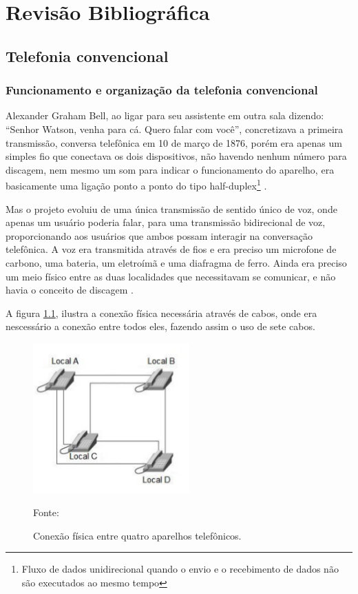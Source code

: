
\chapter{Revisão Bibliográfica} %
\section{Telefonia convencional}
\subsection{Funcionamento e organização da telefonia convencional}

Alexander Graham Bell, ao ligar para seu assistente em outra sala dizendo: “Senhor Watson, venha para cá. Quero falar com você”, concretizava a primeira transmissão, conversa telefônica em 10 de março de 1876, porém era apenas um simples fio que conectava os dois dispositivos, não havendo nenhum número para discagem, nem mesmo um som para indicar o funcionamento do aparelho, era basicamente uma ligação ponto a ponto do tipo half-duplex\footnote{Fluxo de dados unidirecional quando o envio e o recebimento de dados não são executados ao mesmo tempo} \cite{maxaltman2010}.

Mas o projeto evoluiu de uma única transmissão de sentido único de voz, onde apenas um usuário poderia falar, para uma transmissão bidirecional de voz, proporcionando aos usuários que ambos possam interagir na conversação telefônica. A voz era transmitida através de fios e era preciso um microfone de carbono, uma bateria, um eletroímã e uma diafragma de ferro. Ainda era preciso um meio físico entre as duas localidades que necessitavam se comunicar, e não havia o conceito de discagem \cite{eduardomaronasmonks2006}.

A figura \ref{Figura1}, ilustra a conexão física necessária através de cabos, onde era nescessário a conexão entre todos eles, fazendo assim o uso de sete cabos.
\begin{figure}[h]
	\centering
	\includegraphics[width=6.0cm]{imagens/rebeBasicaQuatroTel.jpg}
	\caption{Conexão física entre quatro aparelhos telefônicos.}
    \label{Figura1}
    Fonte: \cite{davidson2008}
\end{figure}

